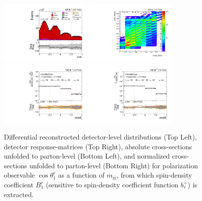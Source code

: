 \clearpage
\begin{figure}[htb]
\begin{center}
 \includegraphics[width=0.40\textwidth]{fig_fullRun2UL/controlplots/combined/Hyp_AntiLeptonBr_vs_TTBarMass.pdf}
 \includegraphics[width=0.40\textwidth]{fig_fullRun2UL/unfolding/combined/ResponseMatrix_b1r_mttbar.pdf} \\
 \includegraphics[width=0.40\textwidth]{fig_fullRun2UL/unfolding/combined/UnfoldedResults_b1r_mttbar.pdf}
 \includegraphics[width=0.40\textwidth]{fig_fullRun2UL/unfolding/combined/UnfoldedResultsNorm_b1r_mttbar.pdf} \\
\label{fig:b1r_mttbar}
\caption{Differential reconstructed detector-level distributions (Top Left), detector response-matrices (Top Right), absolute cross-sections unfolded to parton-level (Bottom Left), and normalized cross-sections unfolded to parton-level (Bottom Right) for polarization observable $\cos\theta_{1}^{r}$ as a function of $m_{t\bar{t}}$, from which spin-density coefficient $B_{1}^{r}$ (sensitive to spin-density coefficient function $b_r^{+}$) is extracted.}
\end{center}
\end{figure}
